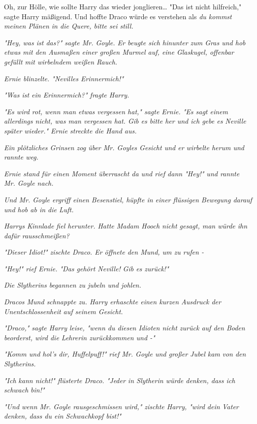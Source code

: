 {Oh, zur Hölle, wie sollte Harry das wieder jonglieren… "Das ist nicht hilfreich," sagte Harry mäßigend. Und hoffte Draco würde es verstehen als \emph{du kommst meinen Plänen in die Quere, bitte sei still.}

\emph{"Hey, was ist das?" sagte Mr. Goyle. Er beugte sich hinunter zum Gras und hob etwas mit den Ausmaßen einer großen Murmel auf, eine Glaskugel, offenbar gefüllt mit wirbelndem weißen Rauch.}

\emph{Ernie blinzelte. "Nevilles Erinnermich!"}

\emph{"Was ist ein Erinnermich?" fragte Harry.}

\emph{"Es wird rot, wenn man etwas vergessen hat," sagte Ernie. "Es sagt einem allerdings nicht, was man vergessen hat. Gib es bitte her und ich gebe es Neville später wieder." Ernie streckte die Hand aus.}

\emph{Ein plötzliches Grinsen zog über Mr. Goyles Gesicht und er wirbelte herum und rannte weg.}

\emph{Ernie stand für einen Moment überrascht da und rief dann "Hey!" und rannte Mr. Goyle nach.}

\emph{Und Mr. Goyle ergriff einen Besenstiel, hüpfte in einer flüssigen Bewegung darauf und hob ab in die Luft.}

\emph{Harrys Kinnlade fiel herunter. Hatte Madam Hooch nicht gesagt, man würde ihn dafür} \emph{\emph{rausschmeißen?}}

\emph{"\emph{Dieser Idiot!}" zischte Draco. Er öffnete den Mund, um zu rufen -}

\emph{"\emph{Hey!}" rief Ernie. "Das gehört Neville!} \emph{\emph{Gib es zurück!}"}

\emph{Die Slytherins begannen zu jubeln und johlen.}

\emph{Dracos Mund schnappte zu. Harry erhaschte einen kurzen Ausdruck der Unentschlossenheit auf seinem Gesicht.}

\emph{"Draco," sagte Harry leise, "wenn du diesen Idioten nicht zurück auf den Boden beorderst, wird die Lehrerin zurückkommen und -"}

\emph{"\emph{Komm und hol's dir, Huffelpuff!}" rief Mr. Goyle und großer Jubel kam} \emph{von den Slytherins.}

\emph{"Ich} \emph{\emph{kann nicht!}" flüsterte Draco. "Jeder in Slytherin würde denken, dass ich} \emph{\emph{schwach}} \emph{bin!"}

\emph{"Und wenn Mr. Goyle rausgeschmissen wird," zischte Harry, "wird dein} \emph{\emph{Vater}} \emph{denken, dass du ein Schwachkopf bist!"}

}
